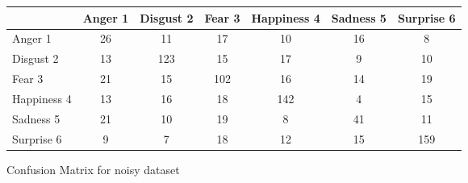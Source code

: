 \begin{figure}[h]
  \begin{center}
    \caption{Confusion Matrix for noisy dataset}
    \begin{tabular}{ | l || c | c | c | c | c | c | }
    \hline
          & Anger 1 & Disgust 2 & Fear 3 & Happiness 4 & Sadness 5 & Surprise 6 \\ \hline \hline
        Anger 1 & 26 & 11 & 17 & 10 & 16 & 8 \\ \hline
        Disgust 2 & 13 & 123 & 15 & 17 & 9 & 10 \\ \hline
        Fear 3 & 21 & 15 & 102 & 16 & 14 & 19 \\ \hline
        Happiness 4 & 13 & 16 & 18 & 142 & 4 & 15\\ \hline
        Sadness 5 & 21 & 10 & 19 & 8 & 41 & 11\\ \hline
        Surprise 6 & 9 & 7 & 18 & 12 & 15 & 159 \\ \hline
    \end{tabular}
    \label{fig:confusionMatrix}
\end{center}
\end{figure}
